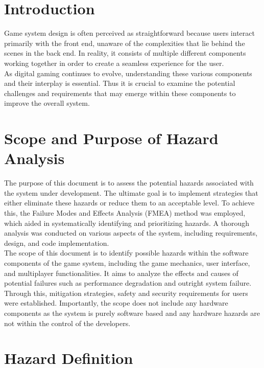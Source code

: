 \documentclass{article}
\begin{document}


\section{Introduction}

Game system design is often perceived as straightforward because users interact primarily with the front end, unaware of the complexities that lie behind the scenes in the back end. In reality, it consists of multiple different components working together in order to create a seamless experience for the user.\\

As digital gaming continues to evolve, understanding these various components and their interplay is essential. Thus it is crucial to examine the potential challenges and requirements that may emerge within these components to improve the overall system.

\section{Scope and Purpose of Hazard Analysis}

The purpose of this document is to assess the potential hazards associated with the system under development. The ultimate goal is to implement strategies that either eliminate these hazards or reduce them to an acceptable level. To achieve this, the Failure Modes and Effects Analysis (FMEA) method was employed, which aided in systematically identifying and prioritizing hazards. A thorough analysis was conducted on various aspects of the system, including requirements, design, and code implementation.\\

The scope of this document is to identify possible hazards within the software components of the game system, including the game mechanics, user interface, and multiplayer functionalities. It aims to analyze the effects and causes of potential failures such as performance degradation and outright system failure. Through this, mitigation strategies, safety and security requirements for users were established. Importantly, the scope does not include any hardware components as the system is purely software based and any hardware hazards are not within the control of the developers.

\section{Hazard Definition}
\end{document}
